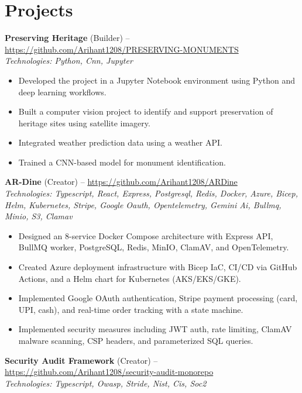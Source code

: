 \documentclass[11pt,a4paper]{article}
\begin{document}
\section{Projects}
\textbf{Preserving Heritage} (Builder) -- \href{https://github.com/Arihant1208/PRESERVING-MONUMENTS}{https://github.com/Arihant1208/PRESERVING-MONUMENTS}
\\ \textit{Technologies: Python, Cnn, Jupyter}
\begin{itemize}
  \item Developed the project in a Jupyter Notebook environment using Python and deep learning workflows.
  \item Built a computer vision project to identify and support preservation of heritage sites using satellite imagery.
  \item Integrated weather prediction data using a weather API.
  \item Trained a CNN-based model for monument identification.
\end{itemize}
\vspace{2pt}
\textbf{AR-Dine} (Creator) -- \href{https://github.com/Arihant1208/ARDine}{https://github.com/Arihant1208/ARDine}
\\ \textit{Technologies: Typescript, React, Express, Postgresql, Redis, Docker, Azure, Bicep, Helm, Kubernetes, Stripe, Google Oauth, Opentelemetry, Gemini Ai, Bullmq, Minio, S3, Clamav}
\begin{itemize}
  \item Designed an 8-service Docker Compose architecture with Express API, BullMQ worker, PostgreSQL, Redis, MinIO, ClamAV, and OpenTelemetry.
  \item Created Azure deployment infrastructure with Bicep IaC, CI/CD via GitHub Actions, and a Helm chart for Kubernetes (AKS/EKS/GKE).
  \item Implemented Google OAuth authentication, Stripe payment processing (card, UPI, cash), and real-time order tracking with a state machine.
  \item Implemented security measures including JWT auth, rate limiting, ClamAV malware scanning, CSP headers, and parameterized SQL queries.
\end{itemize}
\vspace{2pt}
\textbf{Security Audit Framework} (Creator) -- \href{https://github.com/Arihant1208/security-audit-monorepo}{https://github.com/Arihant1208/security-audit-monorepo}
\\ \textit{Technologies: Typescript, Owasp, Stride, Nist, Cis, Soc2}
\end{document}
